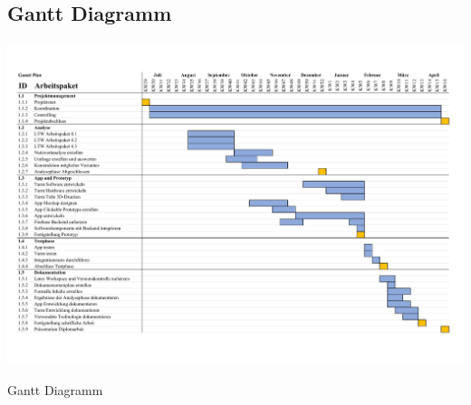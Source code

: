\subsection{Gantt Diagramm}

\begin{table}[H]
  \centering
  \includegraphics[height=0.9\textwidth, width=0.9\textheight, angle=90, keepaspectratio]{misc/gantt.pdf}
  \caption{Gantt Diagramm}
  \label{tab:gantt}
\end{table}
